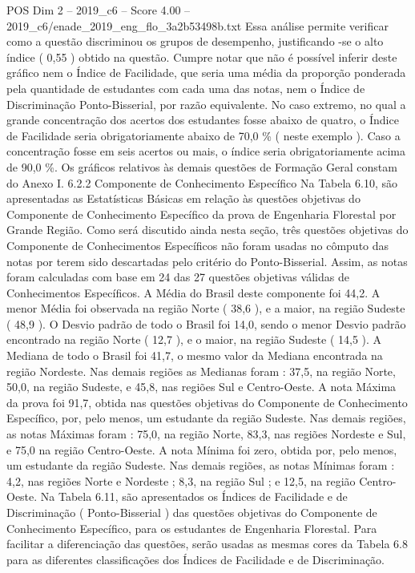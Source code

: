 \begin{textsample}{POS Dim 2 – 2019\_c6 – Score 4.00 – 2019\_c6/enade\_2019\_eng\_flo\_3a2b53498b.txt}
Essa análise permite verificar como a questão discriminou os grupos de desempenho, justificando -se o alto índice ( 0,55 ) obtido na questão.
Cumpre notar que não é possível inferir deste gráfico nem o Índice de Facilidade, que seria uma média da proporção ponderada pela quantidade de estudantes com cada uma das notas, nem o Índice de Discriminação Ponto-Bisserial, por razão equivalente.
No caso extremo, no qual a grande concentração dos acertos dos estudantes fosse abaixo de quatro, o Índice de Facilidade seria obrigatoriamente abaixo de 70,0 \% ( neste exemplo ).
Caso a concentração fosse em seis acertos ou mais, o índice seria obrigatoriamente acima de 90,0 \%.
Os gráficos relativos às demais questões de Formação Geral constam do Anexo I. 6.2.2 Componente de Conhecimento Específico Na Tabela 6.10, são apresentadas as Estatísticas Básicas em relação às questões objetivas do Componente de Conhecimento Específico da prova de Engenharia Florestal por Grande Região.
Como será discutido ainda nesta seção, três questões objetivas do Componente de Conhecimentos Específicos não foram usadas no cômputo das notas por terem sido descartadas pelo critério do Ponto-Bisserial.
Assim, as notas foram calculadas com base em 24 das 27 questões objetivas válidas de Conhecimentos Específicos.
A Média do Brasil deste componente foi 44,2.
A menor Média foi observada na região Norte ( 38,6 ), e a maior, na região Sudeste ( 48,9 ).
O Desvio padrão de todo o Brasil foi 14,0, sendo o menor Desvio padrão encontrado na região Norte ( 12,7 ), e o maior, na região Sudeste ( 14,5 ).
A Mediana de todo o Brasil foi 41,7, o mesmo valor da Mediana encontrada na região Nordeste.
Nas demais regiões as Medianas foram : 37,5, na região Norte, 50,0, na região Sudeste, e 45,8, nas regiões Sul e Centro-Oeste.
A nota Máxima da prova foi 91,7, obtida nas questões objetivas do Componente de Conhecimento Específico, por, pelo menos, um estudante da região Sudeste.
Nas demais regiões, as notas Máximas foram : 75,0, na região Norte, 83,3, nas regiões Nordeste e Sul, e 75,0 na região Centro-Oeste.
A nota Mínima foi zero, obtida por, pelo menos, um estudante da região Sudeste.
Nas demais regiões, as notas Mínimas foram : 4,2, nas regiões Norte e Nordeste ; 8,3, na região Sul ; e 12,5, na região Centro-Oeste.
Na Tabela 6.11, são apresentados os Índices de Facilidade e de Discriminação ( Ponto-Bisserial ) das questões objetivas do Componente de Conhecimento Específico, para os estudantes de Engenharia Florestal.
Para facilitar a diferenciação das questões, serão usadas as mesmas cores da Tabela 6.8 para as diferentes classificações dos Índices de Facilidade e de Discriminação.

\end{textsample}
